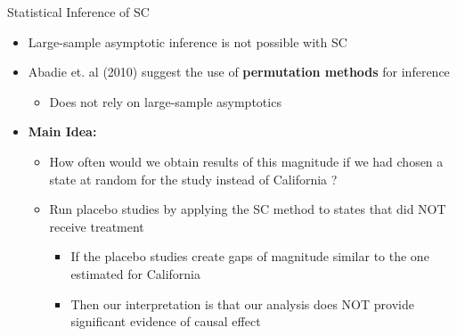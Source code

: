 \documentclass[hyperref={pdfpagelabels=false}]{beamer}
\begin{document}
\begin{frame}{Statistical Inference of SC}
\begin{itemize}
\item Large-sample asymptotic inference is not possible with SC
\vspace{0.2cm}
\item Abadie et. al (2010) suggest the use of \textbf{permutation methods} for inference 
\vspace{0.2cm}
	\begin{itemize}
	\item Does not rely on large-sample asymptotics
\end{itemize}
\vspace{0.2cm}
\item \textbf{Main Idea:} 
\vspace{0.2cm}
\begin{itemize}
\item How often would we obtain results of this magnitude if we had chosen a state at random for the study instead of California ?
\vspace{0.2cm}

\item Run placebo studies by applying the SC method to states that did NOT receive treatment
\vspace{0.2cm}
\begin{itemize}
\item  If the placebo studies create gaps of magnitude similar to the one estimated for California 
\vspace{0.2cm}
\item Then our interpretation is that
our analysis does NOT provide significant evidence of causal effect
\end{itemize}
\end{itemize}
\end{itemize}
\end{frame}
\end{document}
